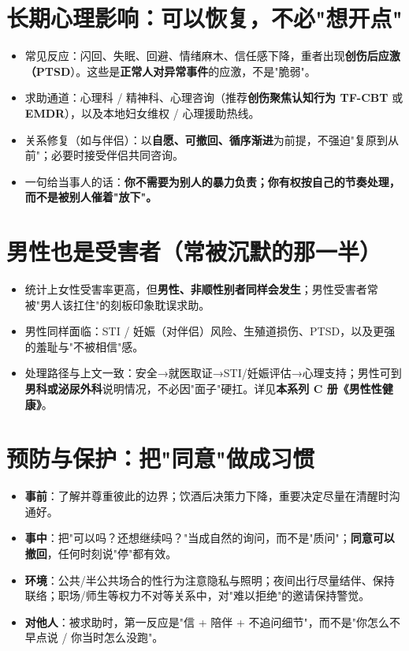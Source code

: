 \section{长期心理影响：可以恢复，不必"想开点"}
\begin{itemize}
  \item 常见反应：闪回、失眠、回避、情绪麻木、信任感下降，重者出现\textbf{创伤后应激（PTSD}）。这些是\textbf{正常人对异常事件}的应激，不是"脆弱"。
  \item 求助通道：心理科 / 精神科、心理咨询（推荐\textbf{创伤聚焦认知行为 TF-CBT} 或\textbf{EMDR}），以及本地妇女维权 / 心理援助热线。
  \item 关系修复（如与伴侣）：以\textbf{自愿、可撤回、循序渐进}为前提，不强迫"复原到从前"；必要时接受伴侣共同咨询。
  \item 一句给当事人的话：\textbf{你不需要为别人的暴力负责；你有权按自己的节奏处理，而不是被别人催着"放下"。}
\end{itemize}

\section{男性也是受害者（常被沉默的那一半）}
\begin{itemize}
  \item 统计上女性受害率更高，但\textbf{男性、非顺性别者同样会发生}；男性受害者常被"男人该扛住"的刻板印象耽误求助。
  \item 男性同样面临：STI / 妊娠（对伴侣）风险、生殖道损伤、PTSD，以及更强的羞耻与"不被相信"感。
  \item 处理路径与上文一致：安全→就医取证→STI/妊娠评估→心理支持；男性可到\textbf{男科或泌尿外科}说明情况，不必因"面子"硬扛。详见\textbf{本系列 C 册《男性性健康》}。
\end{itemize}

\section{预防与保护：把"同意"做成习惯}
\begin{itemize}
  \item \textbf{事前}：了解并尊重彼此的边界；饮酒后决策力下降，重要决定尽量在清醒时沟通好。
  \item \textbf{事中}：把"可以吗？还想继续吗？"当成自然的询问，而不是"质问"；\textbf{同意可以撤回}，任何时刻说"停"都有效。
  \item \textbf{环境}：公共/半公共场合的性行为注意隐私与照明；夜间出行尽量结伴、保持联络；职场/师生等权力不对等关系中，对"难以拒绝"的邀请保持警觉。
  \item \textbf{对他人}：被求助时，第一反应是"信 + 陪伴 + 不追问细节"，而不是"你怎么不早点说 / 你当时怎么没跑"。
\end{itemize}

